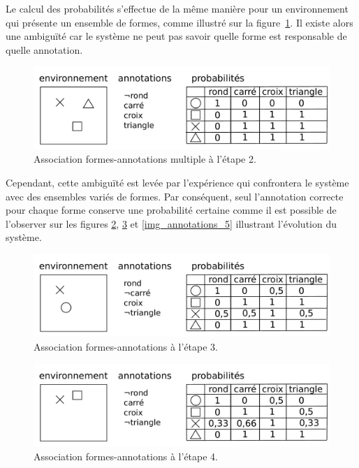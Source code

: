 Le calcul des probabilités s'effectue de la même manière pour un environnement qui présente un ensemble de formes, comme illustré sur la figure~\ref{img_annotations_2}. Il existe alors une ambiguïté car le système ne peut pas savoir quelle forme est responsable de quelle annotation.  

\begin{figure}[H] 
\includegraphics[width=\textwidth]{files/raisonneur/annotations_2} 
\caption{Association formes-annotations multiple à l'étape 2.} 
\label{img_annotations_2}
\end{figure}

Cependant, cette ambiguïté est levée par l'expérience qui confrontera le système avec des ensembles variés de formes. Par conséquent, seul l'annotation correcte pour chaque forme conserve une probabilité certaine comme il est possible de l'observer sur les figures \ref{img_annotations_3}, \ref{img_annotations_4} et \ref{img_annotations_5} illustrant l'évolution du système. 

\begin{figure}[H] 
\includegraphics[width=\textwidth]{files/raisonneur/annotations_3} 
\caption{Association formes-annotations à l'étape 3.} 
\label{img_annotations_3}
\end{figure}

\begin{figure}[H] 
\includegraphics[width=\textwidth]{files/raisonneur/annotations_4} 
\caption{Association formes-annotations à l'étape 4.} 
\label{img_annotations_4}
\end{figure}

